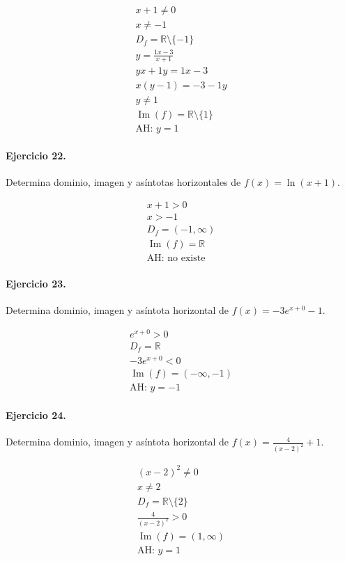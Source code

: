 \documentclass[11pt,a4paper]{article}
\begin{document}
\[
\begin{aligned}
x+1\ne0\\
x\ne -1\\
D_f=\mathbb{R}\setminus\{-1\}\\
y=\frac{1x-3}{x+1}\\
yx+1y=1x-3\\
x(y-1)=-3-1y\\
y\ne 1\\
\operatorname{Im}(f)=\mathbb{R}\setminus\{1\}\\
\text{AH: }y=1
\end{aligned}
\]


\paragraph{Ejercicio 22.} Determina dominio, imagen y asíntotas horizontales de $f(x)=\ln(x+1)$.

\[
\begin{aligned}
x+1>0\\
x>-1\\
D_f=(-1,\infty)\\
\operatorname{Im}(f)=\mathbb{R}\\
\text{{AH: no existe}}
\end{aligned}
\]


\paragraph{Ejercicio 23.} Determina dominio, imagen y asíntota horizontal de $f(x)=-3e^{x+0}-1$.

\[
\begin{aligned}
e^{x+0}>0\\
D_f=\mathbb{R}\\
-3e^{x+0}<0\\
\operatorname{Im}(f)=(-\infty,-1)\\
\text{AH: }y=-1
\end{aligned}
\]


\paragraph{Ejercicio 24.} Determina dominio, imagen y asíntota horizontal de $f(x)=\frac{4}{(x-2)^2}+1$.

\[
\begin{aligned}
(x-2)^2\ne0\\
x\ne 2\\
D_f=\mathbb{R}\setminus\{2\}\\
\frac{4}{(x-2)^2}>0\\
\operatorname{Im}(f)=(1,\infty)\\
\text{AH: }y=1
\end{aligned}
\]
\end{document}
